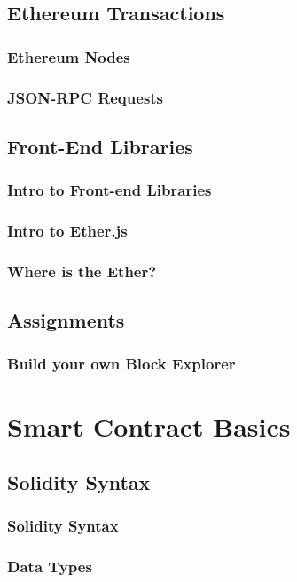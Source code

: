 \documentclass[a4paper, oneside]{book}
\begin{document}
\section{Ethereum Transactions}
\subsection{Ethereum Nodes}
\subsection{JSON-RPC Requests}

\section{Front-End Libraries}
\subsection{Intro to Front-end Libraries}
\subsection{Intro to Ether.js}
\subsection{Where is the Ether?}

\newpage

\section{Assignments}
\subsection{Build your own Block Explorer}


\chapter{Smart Contract Basics}

\section{Solidity Syntax}
\subsection{Solidity Syntax}
\subsection{Data Types}
\end{document}
